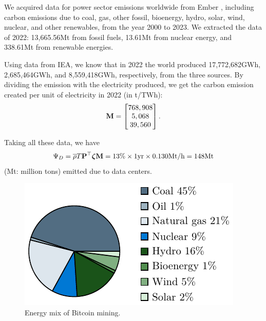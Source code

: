 \documentclass[12pt]{article}
\begin{document}
We acquired data for power sector emissions worldwide from Ember \citep{emission_dataset}, including carbon emissions due to coal, gas, other fossil, bioenergy, hydro, solar, wind, nuclear, and other renewables, from the year 2000 to 2023. We extracted the data of 2022: 13,665.56Mt from fossil fuels, 13.61Mt from nuclear energy, and 338.61Mt from renewable energies.

Using data from IEA, we know that in 2022 the world produced 17,772,682GWh, 2,685,464GWh, and 8,559,418GWh, respectively, from the three sources. By dividing the emission with the electricity produced, we get the carbon emission created per unit of electricity in 2022 (in t/TWh):
\begin{equation}
	\vb{M} = \begin{bmatrix}
		768,908 \\ 5,068 \\ 39,560
	\end{bmatrix}.
\end{equation}

Taking all these data, we have
\begin{equation}
	\Psi_D
	= \overline{\rho} T \vb{P}^\top \boldsymbol{\zeta} \vb{M}
	= 13\% \times 1 {\rm yr} \times 0.130 {\rm Mt/h} = 148 {\rm Mt}
\end{equation}
 (Mt: million tons) emitted due to data centers.

\begin{figure}[!t]
	\centering
	\includegraphics{figures/data/bitcoin_mix.pdf}
	\caption{Energy mix of Bitcoin mining.}
	\label{fig_bitcoin_mix}
\end{figure}
\end{document}
